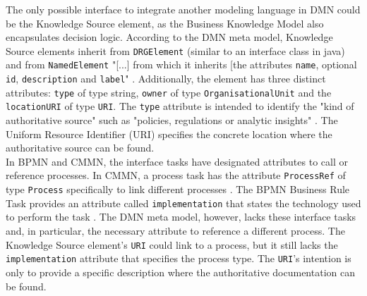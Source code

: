 The only possible interface to integrate another modeling language in DMN could be the Knowledge Source element, as the Business Knowledge Model also encapsulates decision logic. According to the DMN meta model, Knowledge Source elements inherit from \texttt{DRGElement} (similar to an interface class in java) and from \texttt{NamedElement} "[...] from which it inherits [the attributes \texttt{name}, optional \texttt{id}, \texttt{description} and \texttt{label}" \cite{DMNspec2016}. Additionally, the element has three distinct attributes: \texttt{type} of type string, \texttt{owner} of type \texttt{OrganisationalUnit} and the \texttt{locationURI} of type \texttt{URI}. The \texttt{type} attribute is intended to identify the "kind of authoritative source" such as "policies, regulations or analytic insights" \cite{DMNspec2016}. The Uniform Resource Identifier (URI) specifies the concrete location where the authoritative source can be found. \\
In BPMN and CMMN, the interface tasks have designated attributes to call or reference processes. In CMMN, a process task has the attribute \texttt{ProcessRef} of type \texttt{Process} specifically to link different processes \cite{CMMNspec2014}. The BPMN Business Rule Task provides an attribute called \texttt{implementation} that states the technology used to perform the task \cite{BPMNspec}. The DMN meta model, however, lacks these interface tasks and, in particular, the necessary attribute to reference a different process. The Knowledge Source element's \texttt{URI} could link to a process, but it still lacks the \texttt{implementation} attribute that specifies the process type. The \texttt{URI}'s intention is only to provide a specific description where the authoritative documentation can be found.

